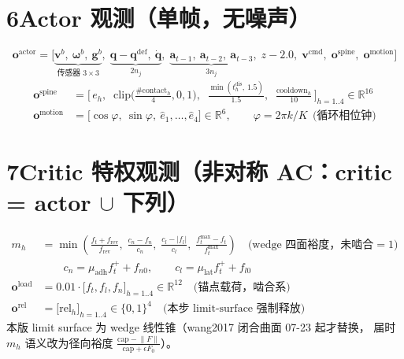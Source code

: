 \documentclass[12pt]{article}
\begin{document}
\newpage
\section*{6\quad Actor 观测（单帧，无噪声）}
\[
\bm o^{\mathrm{actor}} = \Big[
\underbrace{\bm v^b,\ \bm\omega^b,\ \bm g^b}_{\text{传感器 }3\times3},\;
\underbrace{\bm q - \bm q^{\mathrm{def}},\ \dot{\bm q}}_{2n_j},\;
\underbrace{\bm a_{t-1},\ \bm a_{t-2},\ \bm a_{t-3}}_{3n_j},\;
z - 2.0,\;
\bm v^{\mathrm{cmd}},\;
\bm o^{\mathrm{spine}},\;
\bm o^{\mathrm{motion}}
\Big]
\]
\begin{align*}
\bm o^{\mathrm{spine}} &= \Big[\,
  e_h,\;\;
  \mathrm{clip}\big(\tfrac{\#\mathrm{contact}_h}{4},0,1\big),\;\;
  \tfrac{\min(t^{\mathrm{dis}}_h,\,1.5)}{1.5},\;\;
  \tfrac{\mathrm{cooldown}_h}{10}
\,\Big]_{h=1..4} \in \mathbb{R}^{16}\\[4pt]
\bm o^{\mathrm{motion}} &= \big[\cos\varphi,\ \sin\varphi,\ \hat e_1,\dots,\hat e_4\big]
 \in \mathbb{R}^{6},
 \qquad \varphi = 2\pi k / K \ \ \text{(循环相位钟)}
\end{align*}

\newpage
\section*{7\quad Critic 特权观测（非对称 AC：critic = actor $\cup$ 下列）}
\begin{align*}
m_h &= \min\!\left(
  \frac{f_t + f_{\mathrm{rev}}}{f_{\mathrm{rev}}},\;
  \frac{c_n - f_n}{c_n},\;
  \frac{c_l - |f_l|}{c_l},\;
  \frac{f_t^{\max} - f_t}{f_t^{\max}}
\right) \quad\text{(wedge 四面裕度，未啮合}=1)\\[2pt]
&\qquad c_n = \mu_{\mathrm{adh}} f_t^+ + f_{n0},\qquad
        c_l = \mu_{\mathrm{lat}} f_t^+ + f_{l0}\\[8pt]
\bm o^{\mathrm{load}} &= 0.01\cdot\big[f_t, f_l, f_n\big]_{h=1..4} \in \mathbb{R}^{12}
  \quad\text{(锚点载荷，啮合系)}\\[4pt]
\bm o^{\mathrm{rel}} &= \big[\mathrm{rel}_h\big]_{h=1..4} \in \{0,1\}^4
  \quad\text{(本步 limit-surface 强制释放)}
\end{align*}
本版 limit surface 为 wedge 线性锥（wang2017 闭合曲面 07-23 起才替换，
届时 $m_h$ 语义改为径向裕度 $\frac{\mathrm{cap}-\lVert F\rVert}{\mathrm{cap}+\epsilon F_0}$）。
\end{document}

